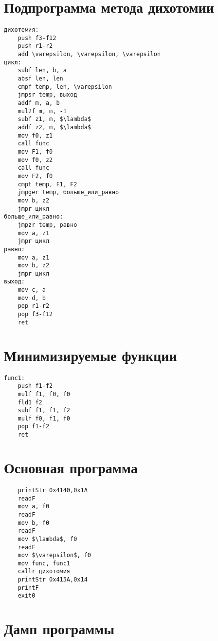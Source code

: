 \documentclass[10pt]{report}
\begin{document}
\section{Подпрограмма метода дихотомии}
\begin{verbatim}
дихотомия:
    push f3-f12
    push r1-r2
    add \varepsilon, \varepsilon, \varepsilon
цикл:
    subf len, b, a
    absf len, len
    cmpf temp, len, \varepsilon
    jmpsr temp, выход
    addf m, a, b
    mul2f m, m, -1
    subf z1, m, $\lambda$
    addf z2, m, $\lambda$
    mov f0, z1
    call func
    mov F1, f0
    mov f0, z2
    call func
    mov F2, f0
    cmpt temp, F1, F2
    jmpger temp, больше_или_равно
    mov b, z2
    jmpr цикл
больше_или_равно:
    jmpzr temp, равно
    mov a, z1
    jmpr цикл    
равно:
    mov a, z1
    mov b, z2
    jmpr цикл
выход:
    mov c, a
    mov d, b
    pop r1-r2
    pop f3-f12
    ret
\end{verbatim}
    
\section{Минимизируемые функции}
\begin{verbatim}
func1:
    push f1-f2
    mulf f1, f0, f0  
    fld1 f2
    subf f1, f1, f2  
    mulf f0, f1, f0 
    pop f1-f2
    ret
\end{verbatim}
    
\section{Основная программа}
    
\begin{verbatim}
    printStr 0x4140,0x1A
    readF
    mov a, f0
    readF
    mov b, f0
    readF
    mov $\lambda$, f0
    readF
    mov $\varepsilon$, f0
    mov func, func1
    callr дихотомия
    printStr 0x415A,0x14    
    printF
    exit0
\end{verbatim}
    
\section{Дамп программы}
    
\end{document}
